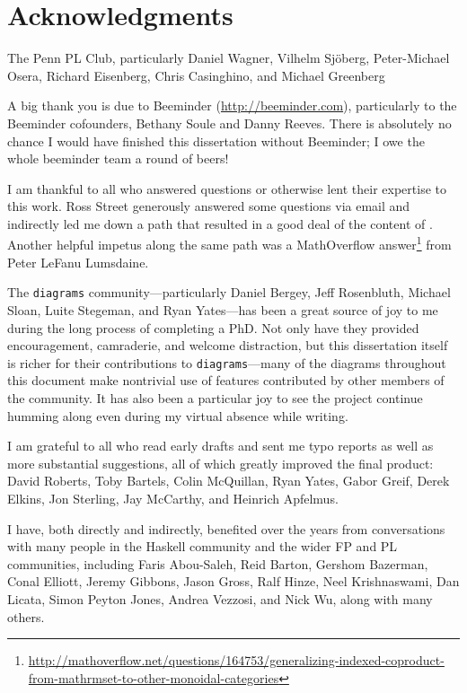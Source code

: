 
\newpage
\chapter*{Acknowledgments}

The Penn PL Club, particularly Daniel Wagner, Vilhelm Sj\"oberg,
Peter-Michael Osera, Richard Eisenberg, Chris Casinghino, and Michael
Greenberg 

A big thank you is due to Beeminder (\url{http://beeminder.com}),
particularly to the Beeminder cofounders, Bethany Soule and Danny
Reeves.  There is absolutely no chance I would have finished this
dissertation without Beeminder; I owe the whole beeminder team a round
of beers!

I am thankful to all who answered questions or otherwise lent their
expertise to this work.  Ross Street generously answered some
questions via email and indirectly led me down a path that resulted in
a good deal of the content of .  Another helpful
impetus along the same path was a MathOverflow
answer\footnote{\url{http://mathoverflow.net/questions/164753/generalizing-indexed-coproduct-from-mathrmset-to-other-monoidal-categories}}
from Peter LeFanu Lumsdaine.

The \texttt{diagrams} community---particularly Daniel Bergey, Jeff
Rosenbluth, Michael Sloan, Luite Stegeman, and Ryan Yates---has been a
great source of joy to me during the long process of completing a PhD.
Not only have they provided encouragement, camraderie, and welcome
distraction, but this dissertation itself is richer for their
contributions to \texttt{diagrams}---many of the diagrams throughout
this document make nontrivial use of features contributed by other
members of the community.  It has also been a particular joy to see
the project continue humming along even during my virtual absence
while writing.

I am grateful to all who read early drafts and sent me typo reports as
well as more substantial suggestions, all of which greatly improved
the final product: David Roberts, Toby Bartels, Colin McQuillan, Ryan
Yates, Gabor Greif, Derek Elkins, Jon Sterling, Jay McCarthy, and
Heinrich Apfelmus.

I have, both directly and indirectly, benefited over the years from
conversations with many people in the Haskell community and the wider
FP and PL communities, including Faris Abou-Saleh, Reid Barton,
Gershom Bazerman, Conal Elliott, Jeremy Gibbons, Jason Gross, Ralf
Hinze, Neel Krishnaswami, Dan Licata, Simon Peyton Jones, Andrea
Vezzosi, and Nick Wu, along with many others.

